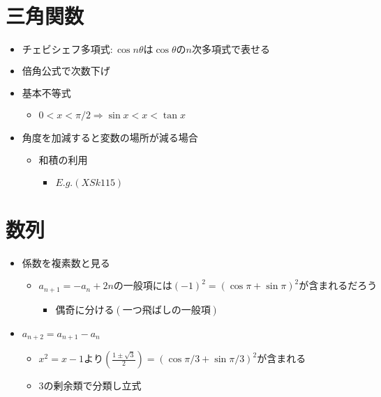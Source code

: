 \documentclass[dvipdfmx,uplatex]{jsarticle}
\begin{document}
\section{三角関数}
\begin{itemize}
	\item $ チェビシェフ多項式: \cos nθ は \cos θ の n 次多項式で表せる$
	\item $ 倍角公式で次数下げ$
	\item $ 基本不等式$
	\begin{itemize}
		\item $ 0 < x < π/2 ⇒ \sin x < x < \tan x$
	\end{itemize}
	\item $ 角度を加減すると変数の場所が減る場合$
	\begin{itemize}
		\item $ 和積の利用$
		\begin{itemize}
			\item $ E.g. (XSk115)$
		\end{itemize}
	\end{itemize}
\end{itemize}

\section{数列}
\begin{itemize}
	\item $ 係数を複素数と見る$
	\begin{itemize}
		\item $ a_{n+1} = -a_n + 2n の一般項には (-1)^2 = (\cos \pi + \sin \pi)^2 が含まれるだろう$
		\begin{itemize}
			\item $ 偶奇に分ける(一つ飛ばしの一般項)$
		\end{itemize}
	\end{itemize}
	\item $ a_{n+2} = a_{n+1} - a_n$
	\begin{itemize}
		\item $ x^2=x-1 より\left(\frac{1\pm\sqrt{3}}{2}\right) = (\cos \pi/3 + \sin \pi/3)^2 が含まれる$
		\item $ 3の剰余類で分類し立式$
	\end{itemize}
\end{itemize}
\end{document}
